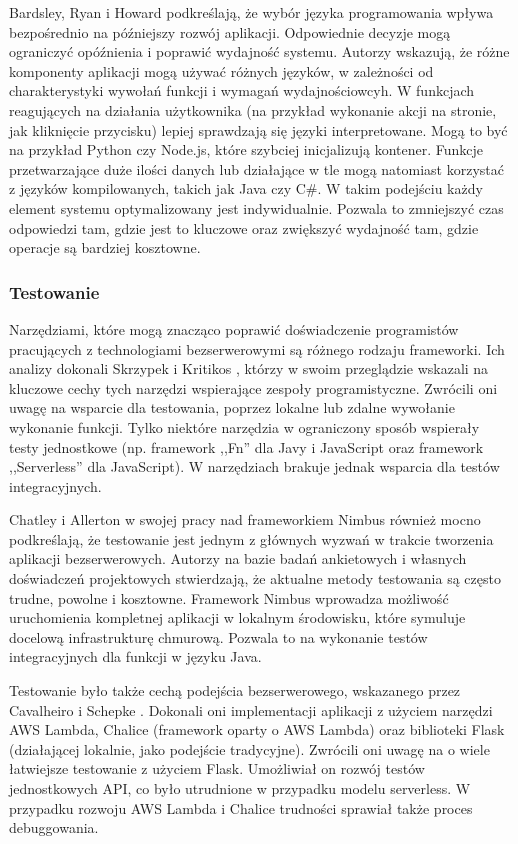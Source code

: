 Bardsley, Ryan i Howard \cite{8513710} podkreślają, że wybór języka programowania wpływa bezpośrednio na późniejszy rozwój aplikacji. 
Odpowiednie decyzje mogą ograniczyć opóźnienia i poprawić wydajność systemu. 
Autorzy wskazują, że różne komponenty aplikacji mogą używać różnych języków, w zależności od charakterystyki wywołań funkcji i wymagań wydajnościowcyh. 
W funkcjach reagujących na działania użytkownika (na przykład wykonanie akcji na stronie, jak kliknięcie przycisku) lepiej sprawdzają się języki interpretowane.
Mogą to być na przykład Python czy Node.js, które szybciej inicjalizują kontener. 
Funkcje przetwarzające duże ilości danych lub działające w tle mogą natomiast korzystać z języków kompilowanych, takich jak Java czy C\#.
W takim podejściu każdy element systemu optymalizowany jest indywidualnie. 
Pozwala to zmniejszyć czas odpowiedzi tam, gdzie jest to kluczowe oraz zwiększyć wydajność tam, gdzie operacje są bardziej kosztowne.

\subsubsection*{Testowanie}

Narzędziami, które mogą znacząco poprawić doświadczenie programistów pracujących z technologiami bezserwerowymi są różnego rodzaju frameworki. 
Ich analizy dokonali Skrzypek i Kritikos \cite{8605774}, którzy w swoim przeglądzie wskazali na kluczowe cechy tych narzędzi wspierające zespoły programistyczne.
Zwrócili oni uwagę na wsparcie dla testowania, poprzez lokalne lub zdalne wywołanie wykonanie funkcji.
Tylko niektóre narzędzia w ograniczony sposób wspierały testy jednostkowe (np. framework ,,Fn'' dla Javy i JavaScript oraz framework ,,Serverless'' dla JavaScript).
W narzędziach brakuje jednak wsparcia dla testów integracyjnych.

Chatley i Allerton \cite{10.1145/3377812.3382135} w swojej pracy nad frameworkiem Nimbus również mocno podkreślają, że testowanie jest jednym z głównych wyzwań w trakcie tworzenia aplikacji bezserwerowych.
Autorzy na bazie badań ankietowych i własnych doświadczeń projektowych stwierdzają, że aktualne metody testowania są często trudne, powolne i kosztowne.
Framework Nimbus wprowadza możliwość uruchomienia kompletnej aplikacji w lokalnym środowisku, które symuluje docelową infrastrukturę chmurową.
Pozwala to na wykonanie testów integracyjnych dla funkcji w języku Java.

Testowanie było także cechą podejścia bezserwerowego, wskazanego przez Cavalheiro i Schepke \cite{Cavalheiro202389}.
Dokonali oni implementacji aplikacji z użyciem narzędzi AWS Lambda, Chalice (framework oparty o AWS Lambda) oraz biblioteki Flask (działającej lokalnie, jako podejście tradycyjne).
Zwrócili oni uwagę na o wiele łatwiejsze testowanie z użyciem Flask. 
Umożliwiał on rozwój testów jednostkowych API, co było utrudnione w przypadku modelu serverless.
W przypadku rozwoju AWS Lambda i Chalice trudności sprawiał także proces debuggowania.

